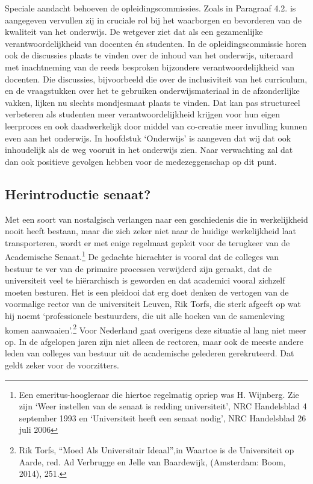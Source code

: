 \documentclass{jote-book}
\begin{document}
	Speciale aandacht behoeven de opleidingscommissies. Zoals in Paragraaf 4.2. is aangegeven vervullen zij in cruciale rol bij het waarborgen en bevorderen van de kwaliteit van het onderwijs. De wetgever ziet dat als een gezamenlijke verantwoordelijkheid van docenten én studenten. In de opleidingscommissie horen ook de discussies plaats te vinden over de inhoud van het onderwijs, uiteraard met inachtneming van de reeds besproken bijzondere verantwoordelijkheid van docenten. Die discussies, bijvoorbeeld die over de inclusiviteit van het curriculum, en de vraagstukken over het te gebruiken onderwijsmateriaal in de afzonderlijke vakken, lijken nu slechts mondjesmaat plaats te vinden. Dat kan pas structureel verbeteren als studenten meer verantwoordelijkheid krijgen voor hun eigen leerproces en ook daadwerkelijk door middel van co-creatie meer invulling kunnen even aan het onderwijs. In hoofdstuk ‘Onderwijs' is aangeven dat wij dat ook inhoudelijk als de weg vooruit in het onderwijs zien. Naar verwachting zal dat dan ook positieve gevolgen hebben voor de medezeggenschap op dit punt.



	\subsection{Herintroductie senaat?}



	Met een soort van nostalgisch verlangen naar een geschiedenis die in werkelijkheid nooit heeft bestaan, maar die zich zeker niet naar de huidige werkelijkheid laat transporteren, wordt er met enige regelmaat gepleit voor de terugkeer van de Academische Senaat.\footnote{Een emeritus-hoogleraar die hiertoe regelmatig opriep was H. Wijnberg. Zie zijn ‘Weer instellen van de senaat is redding universiteit', NRC Handelsblad 4 september 1993 en ‘Universiteit heeft een senaat nodig', NRC Handelsblad 26 juli 2006} De gedachte hierachter is vooral dat de colleges van bestuur te ver van de primaire processen verwijderd zijn geraakt, dat de universiteit veel te hiërarchisch is geworden en dat academici vooral zichzelf moeten besturen. Het is een pleidooi dat erg doet denken de vertogen van de voormalige rector van de universiteit Leuven, Rik Torfs, die sterk afgeeft op wat hij noemt ‘professionele bestuurders, die uit alle hoeken van de samenleving komen aanwaaien'.\footnote{Rik Torfs, “Moed Als Universitair Ideaal”,in Waartoe is de Universiteit op Aarde, red. Ad Verbrugge en Jelle van Baardewijk, (Amsterdam: Boom, 2014), 251. } Voor Nederland gaat overigens deze situatie al lang niet meer op. In de afgelopen jaren zijn niet alleen de rectoren, maar ook de meeste andere leden van colleges van bestuur uit de academische gelederen gerekruteerd. Dat geldt zeker voor de voorzitters.
\end{document}

